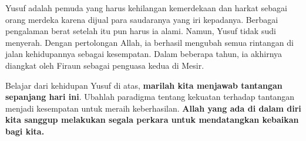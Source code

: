 Yusuf adalah pemuda yang harus kehilangan kemerdekaan dan harkat sebagai orang merdeka karena dijual para saudaranya yang iri kepadanya. Berbagai pengalaman berat setelah itu pun harus ia alami. Namun, Yusuf tidak sudi menyerah. Dengan pertolongan Allah, ia berhasil mengubah semua rintangan di jalan kehidupannya sebagai kesempatan. Dalam beberapa tahun, ia akhirnya diangkat oleh Firaun sebagai penguasa kedua di Mesir.

Belajar dari kehidupan Yusuf di atas, \textbf{marilah kita menjawab tantangan sepanjang hari ini}. Ubahlah paradigma tentang kekuatan terhadap tantangan menjadi kesempatan untuk meraih keberhasilan. \textbf{Allah yang ada di dalam diri kita sanggup melakukan segala perkara untuk mendatangkan kebaikan bagi kita.}

\normalsize